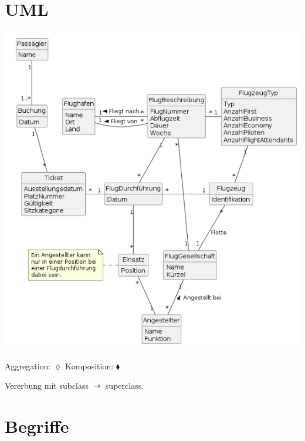 \begin{multicols*}{3}
\section{UML}

\includegraphics[height=\columnwidth-2em,angle=90]{uml2.png}

Aggregation: $\lozenge$ Komposition: $\blacklozenge $

Vererbung mit subclass {\huge$\rightarrowtriangle$} superclass.

\section{Begriffe}


\end{multicols*}
